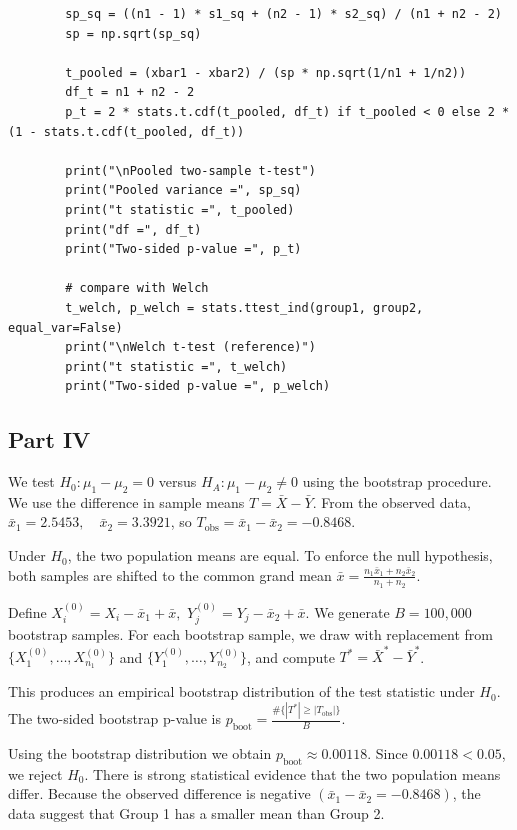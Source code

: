 \documentclass[letterpaper]{article}
\begin{document}
	\begin{lstlisting}
		sp_sq = ((n1 - 1) * s1_sq + (n2 - 1) * s2_sq) / (n1 + n2 - 2)
		sp = np.sqrt(sp_sq)
		
		t_pooled = (xbar1 - xbar2) / (sp * np.sqrt(1/n1 + 1/n2))
		df_t = n1 + n2 - 2
		p_t = 2 * stats.t.cdf(t_pooled, df_t) if t_pooled < 0 else 2 * (1 - stats.t.cdf(t_pooled, df_t))
		
		print("\nPooled two-sample t-test")
		print("Pooled variance =", sp_sq)
		print("t statistic =", t_pooled)
		print("df =", df_t)
		print("Two-sided p-value =", p_t)
		
		# compare with Welch
		t_welch, p_welch = stats.ttest_ind(group1, group2, equal_var=False)
		print("\nWelch t-test (reference)")
		print("t statistic =", t_welch)
		print("Two-sided p-value =", p_welch)
	\end{lstlisting}
	
	
	\clearpage
	
	\subsection{Part IV}
	
	
	We test
	$H_0:\mu_1-\mu_2=0$
	versus
	$H_A:\mu_1-\mu_2\neq0$
	using the bootstrap procedure. We use the difference in sample means
	$T=\bar X-\bar Y$. From the observed data, $\bar x_1=2.5453, \quad \bar x_2=3.3921$, so $T_{\text{obs}}=\bar x_1-\bar x_2=-0.8468$.
	
	Under $H_0$, the two population means are equal. To enforce the null hypothesis, both samples are shifted to the common
	grand mean $\bar x=\frac{n_1\bar x_1+n_2\bar x_2}{n_1+n_2}$.
	
	Define $X_i^{(0)}=X_i-\bar x_1+\bar x,$ $Y_j^{(0)}=Y_j-\bar x_2+\bar x.$ We generate $B=100{,}000$ bootstrap samples.  
	For each bootstrap sample, we draw with replacement from
	$\{X_1^{(0)},\dots,X_{n_1}^{(0)}\}$ and
	$\{Y_1^{(0)},\dots,Y_{n_2}^{(0)}\}$,
	and compute $T^*=\bar X^*-\bar Y^*$.
	
	This produces an empirical bootstrap distribution of the test statistic
	under $H_0$. The two-sided bootstrap p-value is $p_{\text{boot}}
	=\frac{\#\{|T^*|\ge |T_{\text{obs}}|\}}{B}$.
	
	Using the bootstrap distribution we obtain $p_{\text{boot}}\approx0.00118$. Since $0.00118<0.05$, we reject $H_0$. There is strong statistical evidence that the two population means differ.
	Because the observed difference is negative
	$(\bar x_1-\bar x_2=-0.8468)$,
	the data suggest that Group 1 has a smaller mean than Group 2.
	
\end{document}
